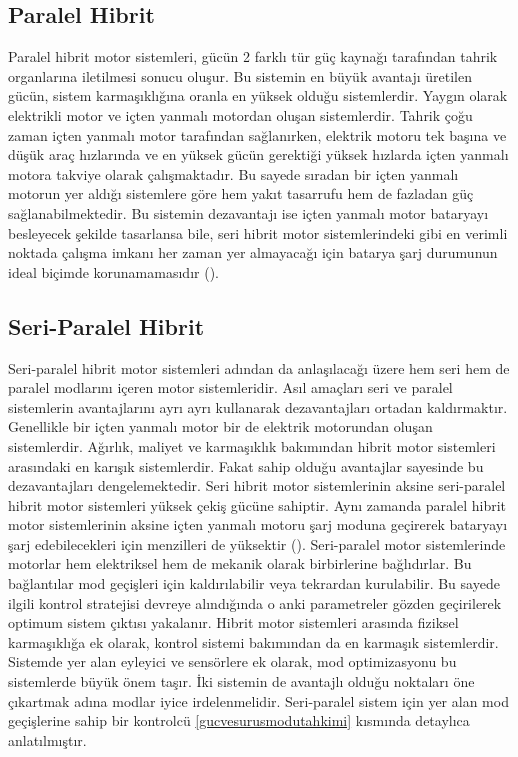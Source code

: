 \subsection{Paralel Hibrit}
\label{paralelhibrit}
Paralel hibrit motor sistemleri, gücün 2 farklı tür güç kaynağı tarafından tahrik organlarına iletilmesi sonucu oluşur.
Bu sistemin en büyük avantajı üretilen gücün, sistem karmaşıklığına oranla en yüksek olduğu sistemlerdir. Yaygın olarak elektrikli motor ve içten yanmalı motordan oluşan
sistemlerdir. Tahrik çoğu zaman içten yanmalı motor tarafından sağlanırken, elektrik motoru tek başına ve düşük araç hızlarında ve en yüksek gücün gerektiği yüksek hızlarda içten yanmalı motora takviye olarak
çalışmaktadır. Bu sayede sıradan bir içten yanmalı motorun yer aldığı sistemlere göre hem yakıt tasarrufu hem de fazladan güç sağlanabilmektedir. Bu sistemin dezavantajı ise içten yanmalı motor bataryayı besleyecek şekilde tasarlansa bile, seri hibrit motor sistemlerindeki gibi en verimli noktada çalışma imkanı 
her zaman yer almayacağı için batarya şarj durumunun ideal biçimde korunamamasıdır (\cite{parallelhybrid}).    

\subsection{Seri-Paralel Hibrit}
\label{seriparalelhibrit}
Seri-paralel hibrit motor sistemleri adından da anlaşılacağı üzere hem seri hem de paralel modlarını içeren motor sistemleridir. Asıl amaçları
seri ve paralel sistemlerin avantajlarını ayrı ayrı kullanarak dezavantajları ortadan kaldırmaktır. Genellikle bir içten yanmalı motor bir de elektrik motorundan oluşan sistemlerdir. 
Ağırlık, maliyet ve karmaşıklık bakımından hibrit motor sistemleri arasındaki en karışık sistemlerdir. Fakat sahip olduğu avantajlar sayesinde bu dezavantajları dengelemektedir.
Seri hibrit motor sistemlerinin aksine seri-paralel hibrit motor sistemleri yüksek çekiş gücüne sahiptir. Aynı zamanda paralel hibrit motor sistemlerinin aksine 
içten yanmalı motoru şarj moduna geçirerek bataryayı şarj edebilecekleri için menzilleri de yüksektir (\cite{seriesparallelhybrid}). Seri-paralel motor sistemlerinde motorlar
hem elektriksel hem de mekanik olarak birbirlerine bağlıdırlar. Bu bağlantılar mod geçişleri için kaldırılabilir veya tekrardan kurulabilir. Bu sayede ilgili kontrol stratejisi devreye alındığında
o anki parametreler gözden geçirilerek optimum sistem çıktısı yakalanır. Hibrit motor sistemleri arasında fiziksel karmaşıklığa ek olarak, kontrol sistemi bakımından da 
en karmaşık sistemlerdir. Sistemde yer alan eyleyici ve sensörlere ek olarak, mod optimizasyonu bu sistemlerde büyük önem taşır. İki sistemin de avantajlı olduğu noktaları öne çıkartmak adına 
modlar iyice irdelenmelidir. Seri-paralel sistem için yer alan mod geçişlerine sahip bir kontrolcü \ref{gucvesurusmodutahkimi} kısmında detaylıca anlatılmıştır. 


